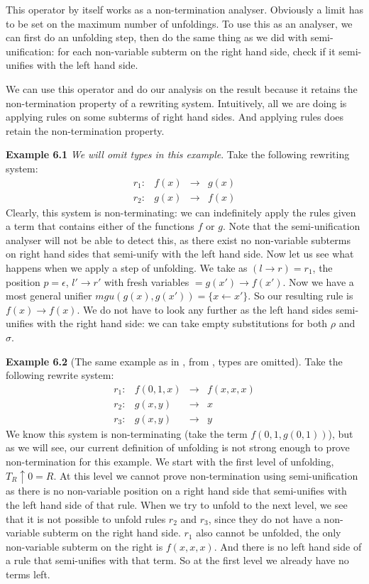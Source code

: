 This operator by itself works as a non-termination analyser. Obviously a limit has to be set on the maximum number of unfoldings. To use this as an analyser, we can first do an unfolding step, then do the same thing as we did with semi-unification: for each non-variable subterm on the right hand side, check if it semi-unifies with the left hand side. 

We can use this operator and do our analysis on the result because it retains the non-termination property of a rewriting system. Intuitively, all we are doing is applying rules on some subterms of right hand sides. And applying rules does retain the non-termination property. 

\textbf{Example 6.1} \textit{We will omit types in this example}. Take the following rewriting system: 
\[
\begin{array}{lrcl}
    r_1: & f(x) & \rightarrow & g(x) \\
    r_2: & g(x) & \rightarrow & f(x)
\end{array}
\]
Clearly, this system is non-terminating: we can indefinitely apply the rules given a term that contains either of the functions $f$ or $g$. Note that the semi-unification analyser will not be able to detect this, as there exist no non-variable subterms on right hand sides that semi-unify with the left hand side. Now let us see what happens when we apply a step of unfolding. We take as $(l \rightarrow r) = r_1$, the position $p = \epsilon$, $l' \rightarrow r'$ with fresh variables $ = g(x') \rightarrow f(x')$. Now we have a most general unifier $\textit{mgu}(g(x), g(x')) = \{ x \leftarrow x' \}$. So our resulting rule is $f(x) \rightarrow f(x)$. We do not have to look any further as the left hand sides semi-unifies with the right hand side: we can take empty substitutions for both $\rho$ and $\sigma$. 

\textbf{Example 6.2} (The same example as in \cite{Payet:Unfolding}, from \cite{TOYAMA1987141}, types are omitted). Take the following rewrite system: 
\[
\begin{array}{lrcl}
    r_1: & f(0, 1, x) & \rightarrow & f(x, x, x) \\
    r_2: & g(x, y) & \rightarrow & x \\
    r_3: & g(x, y) & \rightarrow & y
\end{array}
\]
We know this system is non-terminating (take the term $f(0, 1, g(0, 1))$), but as we will see, our current definition of unfolding is not strong enough to prove non-termination for this example. We start with the first level of unfolding, $T_R \uparrow 0 = R$. At this level we cannot prove non-termination using semi-unification as there is no non-variable position on a right hand side that semi-unifies with the left hand side of that rule. When we try to unfold to the next level, we see that it is not possible to unfold rules $r_2$ and $r_3$, since they do not have a non-variable subterm on the right hand side. $r_1$ also cannot be unfolded, the only non-variable subterm on the right is $f(x, x, x)$. And there is no left hand side of a rule that semi-unifies with that term. So at the first level we already have no terms left.  

